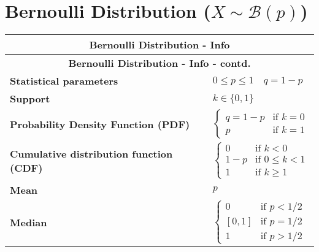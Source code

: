 \chapter{Bernoulli Distribution ($X \sim \mathcal{B}(p)$) \cite{ism-1,wiki/Bernoulli_distribution}}\label{Bernoulli Distribution}



\renewcommand{\arraystretch}{2}
\begin{longtable}{|m{6cm}|p{9cm}|}
    \hline
    \multicolumn{2}{|c|}{\textbf{Bernoulli Distribution - Info} \cite{wiki/Bernoulli_distribution}} \\
    \hline\endfirsthead

    \hline
    \multicolumn{2}{|c|}{\textbf{Bernoulli Distribution - Info - contd.} \cite{wiki/Bernoulli_distribution}} \\
    \hline\endhead
    
    \hline\endfoot
    \hline\endlastfoot

    \hline

    \textbf{Statistical parameters} & 
    ${\displaystyle 0\leq p\leq 1} \quad {\displaystyle q=1-p}$
    \\ \hline
    
    \textbf{Support} & 
    ${\displaystyle k\in \{0,1\}}$
    \\ \hline

    \textbf{Probability Density Function (PDF)} & 
    ${\displaystyle {\begin{cases}q=1-p&{\text{if }}k=0\\p&{\text{if }}k=1\end{cases}}}$
    \\[2ex] \hline
    
    \textbf{Cumulative distribution function (CDF)} & 
    ${\displaystyle {\begin{cases}0&{\text{if }}k<0\\1-p&{\text{if }}0\leq k<1\\1&{\text{if }}k\geq 1\end{cases}}}$
    \\ \hline

    \textbf{Mean} & 
    $p$
    \\ \hline

    \textbf{Median} & 
    ${\displaystyle {\begin{cases}0&{\text{if }}p<1/2\\\left[0,1\right]&{\text{if }}p=1/2\\1&{\text{if }}p>1/2\end{cases}}}$
    \\ \hline


\end{longtable}
